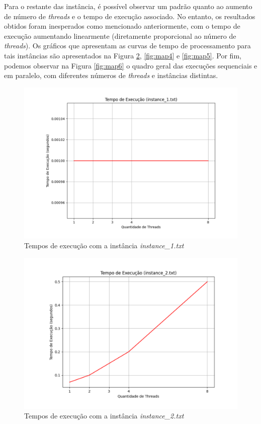 \documentclass[a4paper, 12pt]{article}
\begin{document}
Para o restante das instância, é possível observar um padrão quanto ao aumento de número de \emph{threads} e o tempo de execução associado. No entanto, os resultados obtidos foram inesperados como mencionado anteriormente, com o tempo de execução aumentando linearmente (diretamente proporcional ao número de \emph{threads}). Os gráficos que apresentam as curvas de tempo de processamento para tais instâncias são apresentados na Figura \ref{fig:map3}, \ref{fig:map4} e \ref{fig:map5}. Por fim, podemos observar na Figura \ref{fig:map6} o quadro geral das execuções sequenciais e em paralelo, com diferentes números de \emph{threads} e instâncias distintas.
\begin{figure}[H]
    \centering
    \includegraphics[width=1\textwidth]{Images/instance_1.pdf}
    \vspace*{-1.5cm}
    \caption{Tempos de execução com a instância \emph{instance\_1.txt}}
    \label{fig:map2}
\end{figure}

\begin{figure}[H]
    \centering
    \includegraphics[width=1\textwidth]{Images/instance_2.pdf}
    \vspace*{-1.5cm}
    \caption{Tempos de execução com a instância \emph{instance\_2.txt}}
    \label{fig:map3}
\end{figure}
\end{document}
